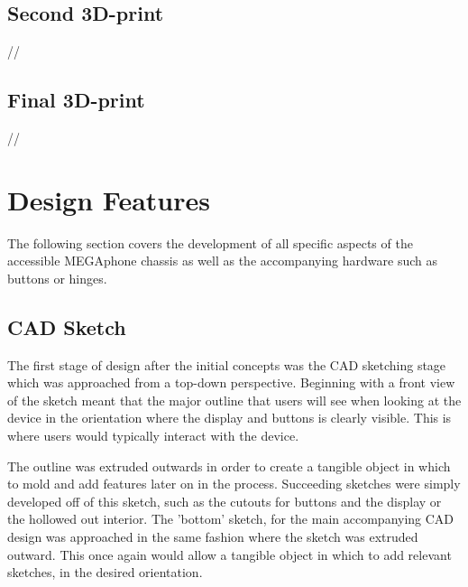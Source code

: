 
\subsection{Second 3D-print}
//

\subsection{Final 3D-print}
//

\section{Design Features}

The following section covers the development of all specific aspects of the accessible MEGAphone chassis as well as the accompanying hardware such as buttons or hinges.

\subsection{CAD Sketch}

The first stage of design after the initial concepts was the CAD sketching stage which was approached from a top-down perspective.
Beginning with a front view of the sketch meant that the major outline that users will see when looking at the device in the orientation where the display and buttons is clearly visible. %
This is where users would typically interact with the device.

The outline was extruded outwards in order to create a tangible object in which to mold and add features later on in the process.
Succeeding sketches were simply developed off of this sketch, such as the cutouts for buttons and the display or the hollowed out interior.
The 'bottom' sketch, for the main accompanying CAD design was approached in the same fashion where the sketch was extruded outward.
This once again would allow a tangible object in which to add relevant sketches, in the desired orientation.

